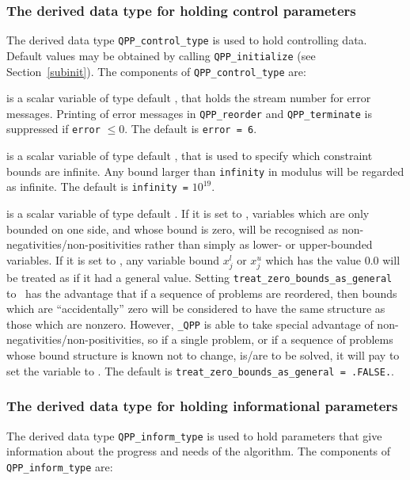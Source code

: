\documentclass{galahad}
\newcommand{\packagename}{QPP}
\newcommand{\fullpackagename}{\libraryname\_\packagename}
\begin{document}

\subsubsection{The derived data type for holding control 
 parameters}\label{typecontrol}
The derived data type 
{\tt \packagename\_control\_type} 
is used to hold controlling data. Default values may be obtained by calling 
{\tt \packagename\_initialize}
(see Section~\ref{subinit}). The components of 
{\tt \packagename\_control\_type} 
are:

\begin{description}

 is a scalar variable of type default \integer, that holds the
stream number for error messages. Printing of error messages in 
{\tt \packagename\_reorder} and {\tt \packagename\_terminate} 
is suppressed if {\tt error} $\leq 0$.
The default is {\tt error = 6}.

 is a scalar variable of type default \realdp, that is used to
specify which constraint bounds are infinite.
Any bound larger than {\tt infinity} in modulus will be regarded as infinite.
The default is {\tt infinity =} $10^{19}$.

 is a scalar variable of type 
default \logical.
If it is set to \false, variables which 
are only bounded on one side, and whose bound is zero,
will be recognised as non-negativities/non-positivities rather than simply as
lower- or upper-bounded variables.
If it is set to \true, any variable bound 
$x_{j}^{l}$ or $x_{j}^{u}$ which has the value 0.0 will be
treated as if it had a general value.
Setting {\tt treat\_zero\_bounds\_as\_general} to \true\ has the advantage
that if a sequence of problems are reordered, then bounds which are
``accidentally'' zero will be considered to have the same structure as
those which are nonzero. However, {\tt \fullpackagename} is
able to take special advantage of non-negativities/non-positivities, so
if a single problem, or if a sequence of problems whose 
bound structure is known not to change, is/are to be solved, 
it will pay to set the variable to \false.
The default is {\tt treat\_zero\_bounds\_as\_general = .FALSE.}.

\end{description}


\subsubsection{The derived data type for holding informational
 parameters}\label{typeinform}
The derived data type 
{\tt \packagename\_inform\_type} 
is used to hold parameters that give information about the progress and needs 
of the algorithm. The components of 
{\tt \packagename\_inform\_type} 
are:
\end{document}
